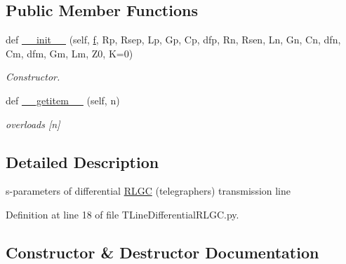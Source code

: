 \subsection*{Public Member Functions}
\begin{DoxyCompactItemize}
\item 
def \hyperlink{classSignalIntegrity_1_1SParameters_1_1Devices_1_1TLineDifferentialRLGC_1_1TLineDifferentialRLGC_a6e2221dcb3e23f6ba4ffa1c0ecb1a5bd}{\+\_\+\+\_\+init\+\_\+\+\_\+} (self, \hyperlink{classSignalIntegrity_1_1SParameters_1_1SParameters_1_1SParameters_a32e7a34d6837fe949b413c852a0447f8}{f}, Rp, Rsep, Lp, Gp, Cp, dfp, Rn, Rsen, Ln, Gn, Cn, dfn, Cm, dfm, Gm, Lm, Z0, K=0)
\begin{DoxyCompactList}\small\item\em Constructor. \end{DoxyCompactList}\item 
def \hyperlink{classSignalIntegrity_1_1SParameters_1_1Devices_1_1TLineDifferentialRLGC_1_1TLineDifferentialRLGC_ab7a6da5139e0878b590d68292aaa70f2}{\+\_\+\+\_\+getitem\+\_\+\+\_\+} (self, n)
\begin{DoxyCompactList}\small\item\em overloads \mbox{[}n\mbox{]} \end{DoxyCompactList}\end{DoxyCompactItemize}


\subsection{Detailed Description}
s-\/parameters of differential \hyperlink{namespaceSignalIntegrity_1_1SParameters_1_1RLGC}{R\+L\+GC} (telegrapher\textquotesingle{}s) transmission line 

Definition at line 18 of file T\+Line\+Differential\+R\+L\+G\+C.\+py.



\subsection{Constructor \& Destructor Documentation}
\mbox{\label{classSignalIntegrity_1_1SParameters_1_1Devices_1_1TLineDifferentialRLGC_1_1TLineDifferentialRLGC_a6e2221dcb3e23f6ba4ffa1c0ecb1a5bd}} 
